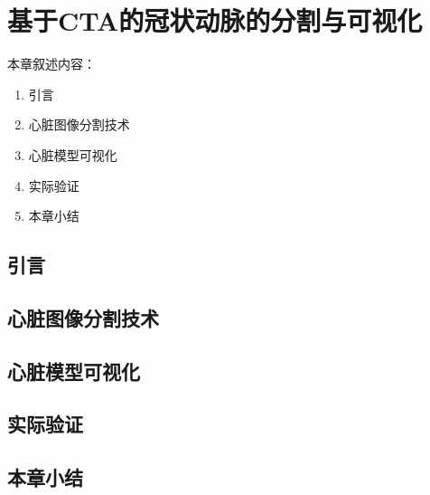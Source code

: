 \chapter{基于CTA的冠状动脉的分割与可视化}
\label{chap5}

本章叙述内容：
\begin{enumerate}
  \item 引言
  \item 心脏图像分割技术
  \item 心脏模型可视化
  \item 实际验证
  \item 本章小结
\end{enumerate}

\section{引言}

\section{心脏图像分割技术}

\section{心脏模型可视化}

\section{实际验证}

\section{本章小结} 